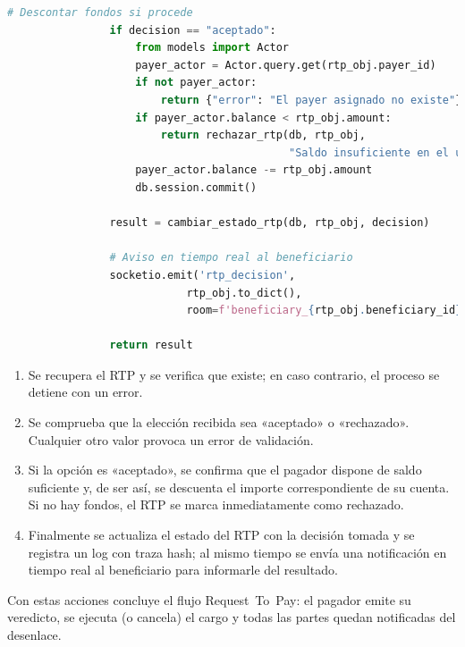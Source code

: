 \begin{itemize}
\begin{lstlisting}[language=Python, style=custom, caption={Servicio de negocio decisión final}]
                # Descontar fondos si procede
                if decision == "aceptado":
                    from models import Actor
                    payer_actor = Actor.query.get(rtp_obj.payer_id)
                    if not payer_actor:
                        return {"error": "El payer asignado no existe"}
                    if payer_actor.balance < rtp_obj.amount:
                        return rechazar_rtp(db, rtp_obj,
                                            "Saldo insuficiente en el último momento")
                    payer_actor.balance -= rtp_obj.amount
                    db.session.commit()

                result = cambiar_estado_rtp(db, rtp_obj, decision)

                # Aviso en tiempo real al beneficiario
                socketio.emit('rtp_decision',
                            rtp_obj.to_dict(),
                            room=f'beneficiary_{rtp_obj.beneficiary_id}')

                return result
        \end{lstlisting}

        \begin{enumerate}
          \item Se recupera el RTP y se verifica que existe; en caso
                contrario, el proceso se detiene con un error.  
          \item Se comprueba que la elección recibida sea «aceptado» o
                «rechazado».  Cualquier otro valor provoca un error de
                validación.  
          \item Si la opción es «aceptado», se confirma que el pagador
                dispone de saldo suficiente y, de ser así, se descuenta el
                importe correspondiente de su cuenta.  Si no hay fondos, el
                RTP se marca inmediatamente como rechazado.  
          \item Finalmente se actualiza el estado del RTP con la decisión
                tomada y se registra un log con traza hash; al mismo tiempo
                se envía una notificación en tiempo real al beneficiario
                para informarle del resultado.  
        \end{enumerate}
        \bigskip

        Con estas acciones concluye el flujo Request~To~Pay: el pagador
        emite su veredicto, se ejecuta (o cancela) el cargo y todas las
        partes quedan notificadas del desenlace.
\end{itemize}

